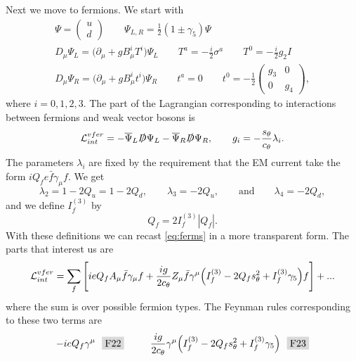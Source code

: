Next we move to fermions. We start with
\begin{gather}
  \label{eq:ferms}
  \Psi=
  \left(\begin{array}{c}
    u \\
    d
  \end{array}\right) \qquad
  \Psi_{L,R}=\frac{1}{2}(1\pm\gamma_5)\Psi \\
  \nonumber
  D_\mu\Psi_L=\big(\partial_\mu+gB_\mu^iT^i\big)\Psi_L \qquad
  T^a=-\frac{i}{2}\sigma^a \qquad
  T^0=-\frac{i}{2}g_2I \\
  \nonumber
  D_\mu\Psi_R=\big(\partial_\mu+gB_\mu^it^i\big)\Psi_R \qquad
  t^a=0 \qquad
  t^0=-\frac{1}{2}
  \left(\begin{array}{cc}
    g_3 & 0  \\
    0   & g_4
  \end{array}\right),
\end{gather}
where $i=0,1,2,3$.
The part of the Lagrangian corresponding to interactions between fermions
and weak vector bosons is
\begin{equation}
  \mathcal{L}_{int}^{vfer}=-\overline{\Psi}_L \slashed{D}\Psi_L
                     -\overline{\Psi}_R \slashed{D}\Psi_R, \qquad
               g_i=-\frac{s_{\theta}}{c_{\theta}}\lambda_i.
\end{equation}
The parameters $\lambda_i$ are fixed by the requirement that the EM current
take the form $iQ_f e \bar{f}\gamma_\mu f$. We get
\begin{equation}
  \lambda_2=1-2Q_u=1-2Q_d, \qquad \lambda_3=-2Q_u, 
            \qquad \text{and} \qquad \lambda_4=-2Q_d,
\end{equation}
and we define $I_f^{(3)}$ by
\begin{equation}
  Q_f=2I_f^{(3)}|Q_f|.
\end{equation}
With these definitions we can recast \eqref{eq:ferms} in a more transparent
form. The parts that interest us are
\begin{equation}
  \label{eq:vfer}
  \mathcal{L}_{int}^{vfer}=\sum\limits_f\Bigg[ieQ_fA_\mu \bar{f}\gamma_\mu f
                      +\frac{ig}{2c_{\theta}}Z_\mu\bar{f}\gamma^\mu
                        \Big(I_f^{(3)}-2Q_fs_{\theta}^2+I_f^{(3)}\gamma_5\Big)f\Bigg]
                      +...
\end{equation}
where the sum is over possible fermion types. The Feynman rules corresponding
to these two terms are
\begin{gather*}
  -ieQ_f \gamma^\mu~~\F{22}~~~~~~~~
  \frac{ig}{2\ct}\gamma^\mu\Big(I_f^{(3)}
                                -2Q_f\st^2+I_f^{(3)}\gamma_5\Big)~~\F{23}
\end{gather*}
